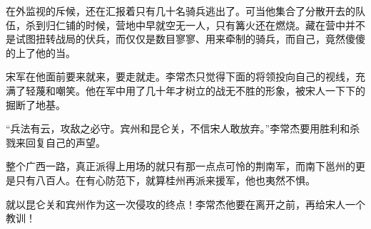 在外监视的斥候，还在汇报着只有几十名骑兵逃出了。可当他集合了分散开去的队伍，杀到归仁铺的时候，营地中早就空无一人，只有篝火还在燃烧。藏在营中并不是试图扭转战局的伏兵，而仅仅是数目寥寥、用来牵制的骑兵，而自己，竟然傻傻的上了他的当。

宋军在他面前要来就来，要走就走。李常杰只觉得下面的将领投向自己的视线，充满了轻蔑和嘲笑。他在军中用了几十年才树立的战无不胜的形象，被宋人一下下的掘断了地基。

“兵法有云，攻敌之必守。宾州和昆仑关，不信宋人敢放弃。”李常杰要用胜利和杀戮来回复自己的声望。

整个广西一路，真正派得上用场的就只有那一点点可怜的荆南军，而南下邕州的更是只有八百人。在有心防范下，就算桂州再派来援军，他也夷然不惧。

就以昆仑关和宾州作为这一次侵攻的终点！李常杰他要在离开之前，再给宋人一个教训！

